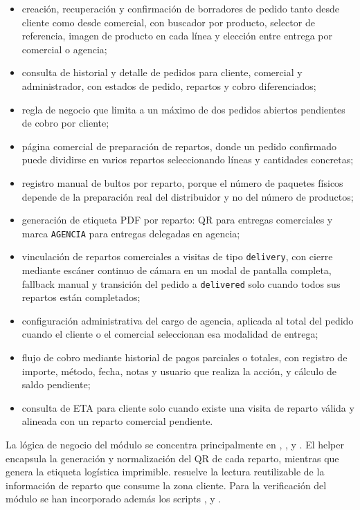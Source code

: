 \begin{itemize}
    \item creación, recuperación y confirmación de borradores de pedido tanto desde cliente como desde comercial, con buscador por producto, selector de referencia, imagen de producto en cada línea y elección entre entrega por comercial o agencia;
    \item consulta de historial y detalle de pedidos para cliente, comercial y administrador, con estados de pedido, repartos y cobro diferenciados;
    \item regla de negocio que limita a un máximo de dos pedidos abiertos pendientes de cobro por cliente;
    \item página comercial de preparación de repartos, donde un pedido confirmado puede dividirse en varios repartos seleccionando líneas y cantidades concretas;
    \item registro manual de bultos por reparto, porque el número de paquetes físicos depende de la preparación real del distribuidor y no del número de productos;
    \item generación de etiqueta PDF por reparto: QR para entregas comerciales y marca \texttt{AGENCIA} para entregas delegadas en agencia;
    \item vinculación de repartos comerciales a visitas de tipo \texttt{delivery}, con cierre mediante escáner continuo de cámara en un modal de pantalla completa, fallback manual y transición del pedido a \texttt{delivered} solo cuando todos sus repartos están completados;
    \item configuración administrativa del cargo de agencia, aplicada al total del pedido cuando el cliente o el comercial seleccionan esa modalidad de entrega;
    \item flujo de cobro mediante historial de pagos parciales o totales, con registro de importe, método, fecha, notas y usuario que realiza la acción, y cálculo de saldo pendiente;
    \item consulta de ETA para cliente solo cuando existe una visita de reparto válida y alineada con un reparto comercial pendiente.
\end{itemize}

La lógica de negocio del módulo se concentra principalmente en , ,  y . El helper  encapsula la generación y normalización del QR de cada reparto, mientras que  genera la etiqueta logística imprimible.  resuelve la lectura reutilizable de la información de reparto que consume la zona cliente. Para la verificación del módulo se han incorporado además los scripts ,  y .

